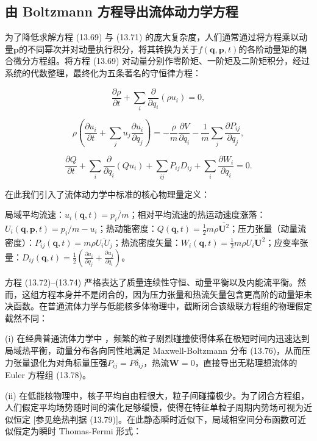 \subsection{由 Boltzmann 方程导出流体动力学方程\label{subsec:13.3.2_=006D41=004F53=0052A8=00529B=005B66=005BFC=0051FA}}

为了降低求解方程 (13.69) 与 (13.71) 的庞大复杂度，人们通常通过将方程乘以动量$\boldsymbol{p}$的不同幂次并对动量执行积分，将其转换为关于$f(\boldsymbol{q},\boldsymbol{p},t)$的各阶动量矩的耦合微分方程组。将方程
(13.69) 对动量分别作零阶矩、一阶矩及二阶矩积分，经过系统的代数整理，最终化为五条著名的守恒律方程：

\[
\frac{\partial\rho}{\partial t}+\sum_{i}\frac{\partial}{\partial q_{i}}(\rho u_{i})=0,
\]

\[
\rho\left(\frac{\partial u_{i}}{\partial t}+\sum_{j}u_{j}\frac{\partial u_{i}}{\partial q_{j}}\right)=-\frac{\rho}{m}\frac{\partial V}{\partial q_{i}}-\frac{1}{m}\sum_{j}\frac{\partial P_{ij}}{\partial q_{j}},
\]

\[
\frac{\partial Q}{\partial t}+\sum_{i}\frac{\partial}{\partial q_{i}}(Qu_{i})+\sum_{ij}P_{ij}D_{ij}+\sum_{i}\frac{\partial W_{i}}{\partial q_{i}}=0.
\]

在此我们引入了流体动力学中标准的核心物理量定义：

局域平均流速：$u_{i}(\boldsymbol{q},t)=\overline{p_{i}/m}$；相对平均流速的热运动速度涨落：$U_{i}(\boldsymbol{q},\boldsymbol{p},t)=p_{i}/m-u_{i}$；热动能密度：$Q(\boldsymbol{q},t)=\frac{1}{2}m\rho\overline{\boldsymbol{U}^{2}}$；压力张量（动量流密度）：$P_{ij}(\boldsymbol{q},t)=m\rho\overline{U_{i}U_{j}}$；热流密度矢量：$W_{i}(\boldsymbol{q},t)=\frac{1}{2}m\rho\overline{U_{i}\boldsymbol{U}^{2}}$；应变率张量：$D_{ij}(\boldsymbol{q},t)=\frac{1}{2}\left(\frac{\partial u_{i}}{\partial q_{j}}+\frac{\partial u_{j}}{\partial q_{i}}\right)$。

方程 (13.72)–(13.74) 严格表达了质量连续性守恒、动量平衡以及内能流平衡。然而，这组方程本身并不是闭合的，因为压力张量和热流矢量包含更高阶的动量矩未决函数。在普通流体力学与低能核多体物理中，截断闭合该级联方程组的物理假定截然不同：

(i) 在经典普通流体力学中 \cite{UF74,Hu63}，频繁的粒子剧烈碰撞使得体系在极短时间内迅速达到局域热平衡，动量分布各向同性地满足
Maxwell-Boltzmann 分布 (13.76)，从而压力张量退化为对角标量压强$P_{ij}=P\delta_{ij}$，热流$\boldsymbol{W}=0$，直接导出无粘理想流体的
Euler 方程组 (13.78)。

(ii) 在低能核物理中，核子平均自由程很大，粒子间碰撞极少。为了闭合方程组，人们假定平均场势随时间的演化足够缓慢，使得在特征单粒子周期内势场可视为近似恒定
{[}参见绝热判据 (13.79){]}。在此静态瞬时近似下，局域相空间分布函数可近似假定为瞬时 Thomas-Fermi 形式：

